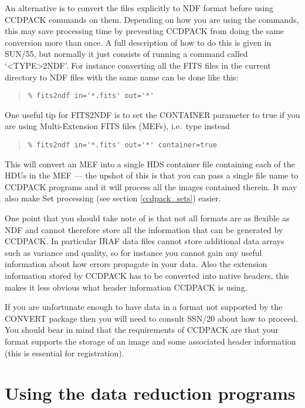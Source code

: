\documentclass[twoside,11pt]{article}
\newcommand{\xref}[3]{#1}
\newcommand{\xlabel}[1]{}
\renewcommand{\_}{\texttt{\symbol{95}}}
\newenvironment{myquote}{\begin{quote}\begin{small}}{\end{small}\end{quote}}
\begin{document}
An alternative is to convert the files explicitly to NDF format
before using CCDPACK commands on them.
Depending on how you are using the commands, this may save processing
time by preventing CCDPACK from doing the same conversion more than once.
A full description of how to do this is given in \xref{SUN/55}{sun55}{},
but normally it just consists of running a command called `<TYPE>2NDF'.
For instance converting all the FITS files in the current directory
to NDF files with the same name can be done like this:
\begin{myquote}
\begin{verbatim}
% fits2ndf in='*.fits' out='*' 
\end{verbatim}
\end{myquote}
One useful tip for \xref{FITS2NDF}{sun55}{FITS2NDF} 
is to set the CONTAINER parameter to true if you are using Multi-Extension
FITS files (MEFs), i.e.\ type instead
\begin{myquote}
\begin{verbatim}
% fits2ndf in='*.fits' out='*' container=true
\end{verbatim}
\end{myquote}
This will convert an MEF into a single HDS container file
containing each of the HDUs in the MEF --- the upshot of this is that
you can pass a single file name to CCDPACK programs and it will
process all the images contained therein.
It may also make Set processing (see section \ref{ccdpack_sets}) easier.

One point that you should take note of is that not all formats are as
flexible as NDF and cannot therefore store all the information that
can be generated by CCDPACK. In particular IRAF data files cannot
store additional data arrays such as variance and quality, so for
instance you cannot gain any useful information about how errors
propagate in your data. Also the extension information stored by
CCDPACK has to be converted into native headers, this makes it less
obvious what header information CCDPACK is using.

If you are unfortunate enough to have data in a format not supported by the
CONVERT package then you will need to consult \xref{SSN/20}{ssn20}{}
about how to proceed. You should bear in mind that the requirements
of CCDPACK are that your format supports the storage of an image and
some associated header information (this is essential for registration).

\section{Using the data reduction programs\xlabel{DIY}}
\end{document}
